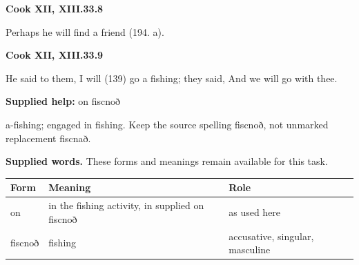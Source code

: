 \par\begin{minipage}{\linewidth}\raggedright
\textbf{Cook XII, XIII.33.8}

Perhaps he will find a friend (194. a).

\end{minipage}\par\addvspace{4pt}

\par\begin{minipage}{\linewidth}\raggedright
\textbf{Cook XII, XIII.33.9}

He said to them, I will (139) go a fishing; they said, And we will go with thee.

\textbf{Supplied help:} on fiscnoð

a-fishing; engaged in fishing. Keep the source spelling fiscnoð, not unmarked replacement fiscnað.

\end{minipage}\par\addvspace{4pt}

\textbf{Supplied words.} These forms and meanings remain available for this task.

\par\begingroup
\fontsize{10.5}{13.2}\selectfont
\setlength{\LTleft}{0pt}\setlength{\LTright}{\fill}
\noindent
\begin{tabular}{@{}>{\raggedright\arraybackslash}p{21.1mm}>{\raggedright\arraybackslash}p{55.07mm}>{\raggedright\arraybackslash}p{42.2mm}@{}}
\toprule
\textbf{Form} & \textbf{Meaning} & \textbf{Role} \\
\midrule
on & in the fishing activity, in supplied on fiscnoð & as used here \\
fiscnoð & fishing & accusative, singular, masculine \\
\bottomrule
\end{tabular}
\par\endgroup

